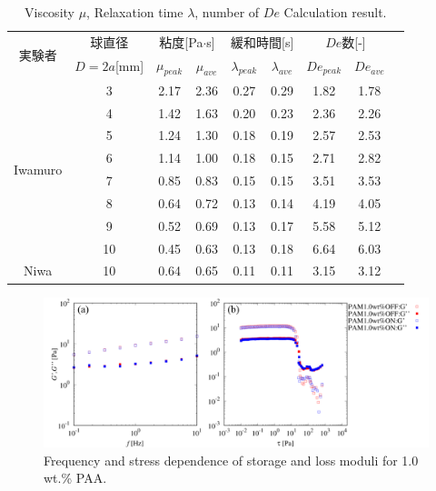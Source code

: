 \begin{table}[hbtp]
    \caption{Viscosity $\mu$, Relaxation time $\lambda$, number of $De$ Calculation result.}
    \label{table:iwamuro2}
    \centering
    \begin{tabular}{ccccccccc}
      \hline
      \multirow{2}{*}{実験者} & 球直径 &\multicolumn{2}{c}{粘度[Pa$\cdot$s]} &\multicolumn{2}{c}{緩和時間[s]}  &\multicolumn{2}{c}{$De$数[-]} \\
       & $D=2a$[mm] & $\mu_{peak}$ & $\mu_{ave}$  &  $\lambda_{peak}$ & $\lambda_{ave}$ & $De_{peak}$ & $De_{ave}$ \\
      \hline \hline
      \multirow{8}{*}{Iwamuro} & 3  & 2.17 & 2.36 & 0.27 & 0.29 & 1.82 & 1.78\\
      & 4  & 1.42 & 1.63 & 0.20 & 0.23 & 2.36 & 2.26\\
      & 5  & 1.24 & 1.30 & 0.18 & 0.19 & 2.57 & 2.53 \\
      & 6  & 1.14 & 1.00 & 0.18 & 0.15 & 2.71 & 2.82\\
      & 7  & 0.85 & 0.83 & 0.15 & 0.15 & 3.51 & 3.53\\
      & 8  & 0.64 & 0.72 & 0.13 & 0.14 & 4.19 & 4.05 \\
      & 9  & 0.52 & 0.69 & 0.13 & 0.17 & 5.58 & 5.12\\
      & 10 & 0.45 & 0.63 & 0.13 & 0.18 & 6.64 & 6.03\\
      \hline \hline
      Niwa & 10 & 0.64 & 0.65 & 0.11 & 0.11 & 3.15 & 3.12 \\
      \hline
    \end{tabular}
\end{table}
\begin{figure}[ht]
    \includegraphics[width=15cm,clip]{5-Discussion/iwamuro-G.PNG}
    \caption{Frequency and stress dependence of storage and loss moduli for 1.0 wt.\% PAA.\cite{ref:8}}
    \label{fig:iwamuro-G}
\end{figure}

